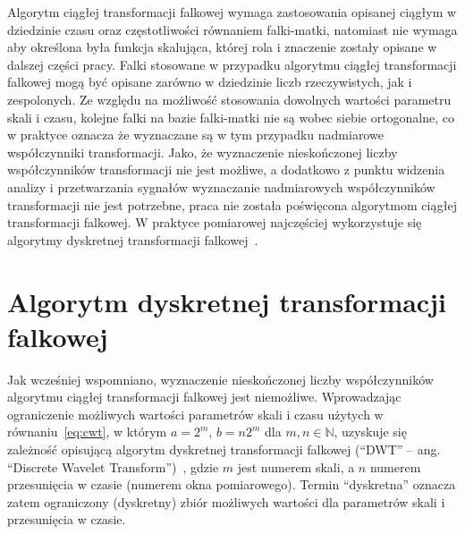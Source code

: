 Algorytm ciągłej transformacji falkowej wymaga zastosowania opisanej ciągłym w dziedzinie czasu oraz częstotliwości równaniem falki-matki, natomiast nie wymaga aby określona była funkcja skalująca, której rola i znaczenie zostały opisane w dalszej części pracy. Falki stosowane w przypadku algorytmu ciągłej transformacji falkowej mogą być opisane zarówno w dziedzinie liczb rzeczywistych, jak i zespolonych. Ze względu na możliwość stosowania dowolnych wartości parametru skali i czasu, kolejne falki na bazie falki-matki nie są wobec siebie ortogonalne, co w praktyce oznacza że wyznaczane są w tym przypadku nadmiarowe współczynniki transformacji. Jako, że wyznaczenie nieskończonej liczby współczynników transformacji nie jest możliwe, a dodatkowo z punktu widzenia analizy i przetwarzania sygnałów wyznaczanie nadmiarowych współczynników transformacji nie jest potrzebne, praca nie została poświęcona algorytmom ciągłej transformacji falkowej. W praktyce pomiarowej najczęściej wykorzystuje się algorytmy dyskretnej transformacji falkowej~\cite{wallen_handbook, akujuobi_applications}.

\section{Algorytm dyskretnej transformacji falkowej}

Jak wcześniej wspomniano, wyznaczenie nieskończonej liczby współczynników algorytmu ciągłej transformacji falkowej jest niemożliwe. Wprowadzając ograniczenie możliwych wartości parametrów skali i czasu użytych w równaniu~\eqref{eq:cwt}, w którym $a = 2^m$, $b = n2^m$ dla $m, n \in \mathbb{N}$, uzyskuje się zależność opisującą algorytm dyskretnej transformacji falkowej (\enquote{DWT} -- ang. \enquote{Discrete Wavelet Transform})~\cite{wallen_handbook}, gdzie $m$ jest numerem skali, a $n$ numerem przesunięcia w czasie (numerem okna pomiarowego). Termin \enquote{dyskretna} oznacza zatem ograniczony (dyskretny) zbiór możliwych wartości dla parametrów skali i przesunięcia w czasie.

